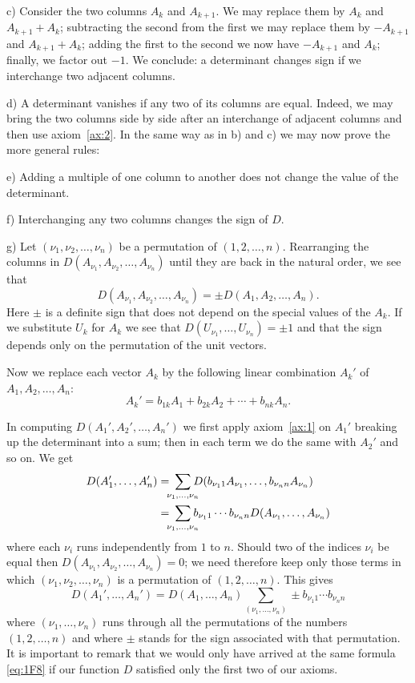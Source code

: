 \documentclass[10pt,leqno,a5paper]{book}
\theoremstyle{definition}
\begin{document}
c) Consider the two columns $A_k$ and $A_{k+1}$.
We may replace them by $A_{k}$ and $A_{k+1} + A_k$; subtracting the second from the first we may replace them by $-A_{k+1}$ and $A_{k+1} + A_k$; adding the first to the second we now have $-A_{k+1}$ and $A_k$; finally, we factor out $-1$.
We conclude: a determinant changes sign if we interchange two adjacent columns.

d) A determinant vanishes if any two of its columns are equal.
Indeed, we may bring the two columns side by side after an interchange of adjacent columns and then use axiom~\ref{ax:2}.
In the same way as in b) and c) we may now prove the more general rules:

e) Adding a multiple of one column to another does not change the value of the determinant.

f) Interchanging any two columns changes the sign of $D$.

g) Let $(\nu_1, \nu_2, \ldots, \nu_n)$ be a permutation of $(1,2,\ldots,n)$.
Rearranging the columns in $D(A_{\nu_1}, A_{\nu_2}, \ldots, A_{\nu_n})$ until they are back in the natural order, we see that
\[
D(A_{\nu_1}, A_{\nu_2}, \ldots, A_{\nu_n})
= \pm D(A_1, A_2, \ldots, A_n).
\]
Here $\pm$ is a definite sign that does not depend on the special values of the $A_k$.
If we substitute $U_k$ for $A_k$ we see that $D(U_{\nu_1}, \ldots, U_{\nu_n}) = \pm 1$ and that the sign depends only on the permutation of the unit vectors.

Now we replace each vector $A_k$ by the following linear combination $A_k'$ of $A_1, A_2, \ldots, A_n$:
\begin{equation}
\label{eq:1F6}
A_k' = b_{1k} A_1 + b_{2k} A_2 + \cdots + b_{nk} A_n.
\end{equation}

In computing $D(A_1', A_2', \ldots, A_n')$ we first apply axiom~\ref{ax:1} on $A_1'$ breaking up the determinant into a sum; then in each term we do the same with $A_2'$ and so on.
We get
\begin{align}
\label{eq:1F7}
D(A_1', \ldots, A_n')
&=
\!\!\!
\sum_{\nu_1,\ldots,\nu_n}
\!\!\!\!
D(
b_{\nu_1 1} A_{\nu_1},
\ldots,
b_{\nu_n n} A_{\nu_n}
)
\\
&=
\!\!\!
\sum_{\nu_1,\ldots,\nu_n}
\!\!\!\!
b_{\nu_1 1}
\cdots
b_{\nu_n n}
D(A_{\nu_1}, \ldots, A_{\nu_n})
\notag
\end{align}
where each $\nu_i$ runs independently from $1$ to $n$.
Should two of the indices $\nu_i$ be equal then $D(A_{\nu_1}, A_{\nu_2}, \ldots, A_{\nu_n}) = 0$; we need therefore keep only those terms in which $(\nu_1, \nu_2, \ldots, \nu_n)$ is a permutation of $(1,2,\ldots, n)$.
This gives
\begin{equation}
\label{eq:1F8}
D(A_1', \ldots, A_n')
= D(A_1, \ldots, A_n)
\!\!\!
\sum_{(\nu_1, \ldots, \nu_n)}
\!\!\!\!
\pm b_{\nu_1 1} \cdots b_{\nu_n n}
\end{equation}
where $(\nu_1, \ldots, \nu_n)$ runs through all the permutations of the numbers $(1,2,\ldots,n)$ and where $\pm$ stands for the sign associated with that permutation.
It is important to remark that we would only have arrived at the same formula \eqref{eq:1F8} if our function $D$ satisfied only the first two of our axioms.
\end{document}
